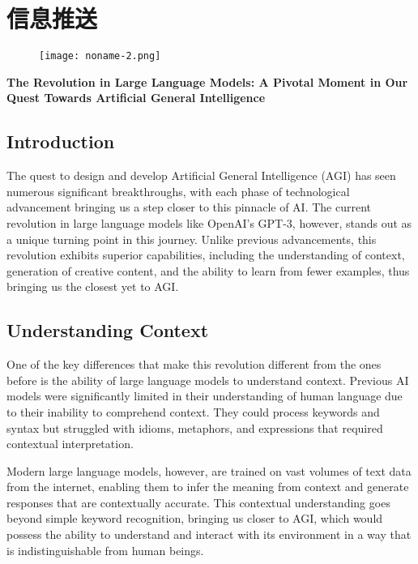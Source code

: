 \section{信息推送}

\begin{figure}[htpb]
    \centering
    \texttt{[image: noname-2.png]}
    \label{fig:enter-label}
\end{figure}


\noindent\textbf{The Revolution in Large Language Models: A Pivotal Moment in Our Quest Towards Artificial General Intelligence}

\subsection{Introduction}

The quest to design and develop Artificial General Intelligence (AGI) has seen numerous significant breakthroughs, with each phase of technological advancement bringing us a step closer to this pinnacle of AI. The current revolution in large language models like OpenAI's GPT-3, however, stands out as a unique turning point in this journey. Unlike previous advancements, this revolution exhibits superior capabilities, including the understanding of context, generation of creative content, and the ability to learn from fewer examples, thus bringing us the closest yet to AGI.

\subsection{Understanding Context}

One of the key differences that make this revolution different from the ones before is the ability of large language models to understand context. Previous AI models were significantly limited in their understanding of human language due to their inability to comprehend context. They could process keywords and syntax but struggled with idioms, metaphors, and expressions that required contextual interpretation. 

Modern large language models, however, are trained on vast volumes of text data from the internet, enabling them to infer the meaning from context and generate responses that are contextually accurate. This contextual understanding goes beyond simple keyword recognition, bringing us closer to AGI, which would possess the ability to understand and interact with its environment in a way that is indistinguishable from human beings.

